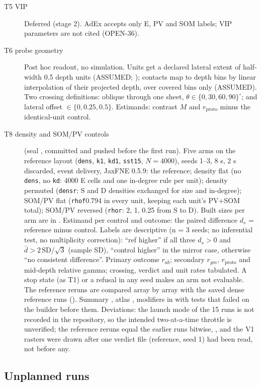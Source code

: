 \begin{description}
\item[T5 VIP] Deferred (stage 2). AdEx accepts only E, PV and SOM labels; VIP parameters are not cited
(OPEN-36).

\item[T6 probe geometry] Post hoc readout, no simulation. Units get a declared lateral extent
of half-width 0.5 depth units (ASSUMED; ); contacts map
to depth bins by linear interpolation of their projected depth, over covered bins only (ASSUMED). Two crossing definitions: oblique through one sheet, $\theta \in \{0, 30, 60, 90\}^\circ$;
and lateral offset $\in \{0, 0.25, 0.5\}$. Estimands: contrast $M$ and $r_\text{proto}$ minus the identical-unit control.

\item[T8 density and SOM/PV controls] (seal , committed and pushed before the first run). Five arms on the
reference layout (\texttt{dens}, \texttt{k1}, \texttt{kd1}, \texttt{sst15}, $N = 4000$), seeds 1--3, 8 s, 2 s
discarded, event delivery, JaxFNE 0.5.9: the reference; density flat (no \texttt{dens}, no \texttt{kd}: 4000 E
cells and one in-degree rule per unit); density permuted (\texttt{densr}: S and D densities exchanged for size
and in-degree); SOM/PV flat (\texttt{rhof}0.794 in every unit, keeping each unit's PV+SOM total); SOM/PV reversed
(\texttt{rhor}: 2, 1, 0.25 from S to D). Built sizes per arm are in . Estimand per control and outcome:
the paired difference $d_s$ = reference minus control. Labels are descriptive (n = 3 seeds; no inferential test, no multiplicity correction): ``ref higher'' if all three $d_s > 0$ and
$\bar d > 2\,\text{SD}/\sqrt{3}$ (sample SD), ``control higher'' in the mirror case, otherwise ``no consistent
difference''. Primary outcome $r_{ab}$; secondary $r_{gm}$, $r_\text{proto}$ and mid-depth relative gamma;
crossing, verdict and unit rates tabulated. A stop state (as T1) or a refusal in any seed makes an arm not
evaluable. The reference reruns are compared array by array with the saved dense reference runs ().
Summary , atlas , modifiers in  with tests that failed on the builder before them.
Deviations: the launch mode of the 15 runs is not recorded in the repository, so the intended two-at-a-time throttle is unverified; the reference reruns equal the earlier runs bitwise, , and the V1 rasters were drawn after one
verdict file (reference, seed 1) had been read, not before any.
\end{description}

\subsection{Unplanned runs}

